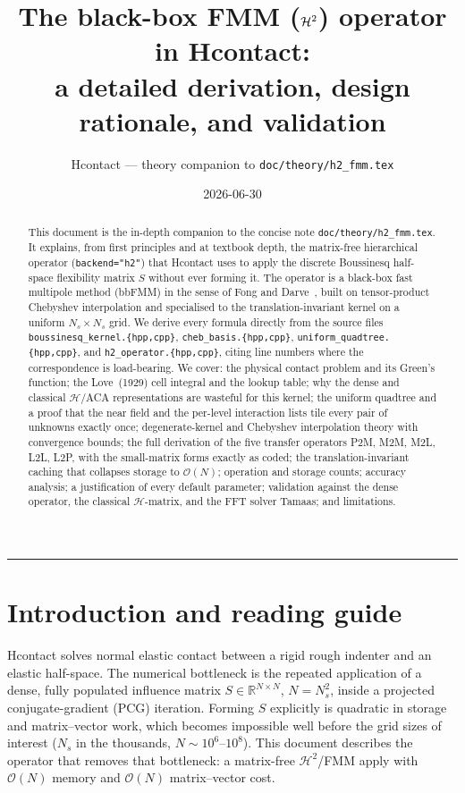 \documentclass[11pt,a4paper]{article}
\title{The black-box FMM ($\Htwo$) operator in Hcontact:\\[4pt]
a detailed derivation, design rationale, and validation}
\author{Hcontact --- theory companion to \texttt{doc/theory/h2\_fmm.tex}}
\date{2026-06-30}
\newcommand{\Order}{\mathcal{O}}
\newcommand{\R}{\mathbb{R}}
\newcommand{\Htwo}{\mathcal{H}^2}
\newcommand{\Hmat}{\mathcal{H}}
\newcommand{\code}[1]{\texttt{#1}}
\theoremstyle{definition}
\theoremstyle{remark}
\begin{document}
\maketitle

\begin{abstract}
This document is the in-depth companion to the concise note
\texttt{doc/theory/h2\_fmm.tex}. It explains, from first principles and at
textbook depth, the matrix-free hierarchical operator (\code{backend="h2"})
that Hcontact uses to apply the discrete Boussinesq half-space flexibility
matrix $S$ without ever forming it. The operator is a black-box fast multipole
method (bbFMM) in the sense of Fong and Darve~\cite{FongDarve2009}, built on
tensor-product Chebyshev interpolation and specialised to the
translation-invariant kernel on a uniform $N_s\times N_s$ grid. We derive every
formula directly from the source files \code{boussinesq\_kernel.\{hpp,cpp\}},
\code{cheb\_basis.\{hpp,cpp\}}, \code{uniform\_quadtree.\{hpp,cpp\}}, and
\code{h2\_operator.\{hpp,cpp\}}, citing line numbers where the correspondence is
load-bearing. We cover: the physical contact problem and its Green's function;
the Love~(1929) cell integral and the lookup table; why the dense and classical
$\Hmat$/ACA representations are wasteful for this kernel; the uniform quadtree
and a proof that the near field and the per-level interaction lists tile every
pair of unknowns exactly once; degenerate-kernel and Chebyshev interpolation
theory with convergence bounds; the full derivation of the five transfer
operators P2M, M2M, M2L, L2L, L2P, with the small-matrix forms exactly as
coded; the translation-invariant caching that collapses storage to $\Order(N)$;
operation and storage counts; accuracy analysis; a justification of every
default parameter; validation against the dense operator, the classical
$\Hmat$-matrix, and the FFT solver Tamaas; and limitations.
\end{abstract}

\tableofcontents
\bigskip
\hrule

\section{Introduction and reading guide}
\label{sec:intro}

Hcontact solves normal elastic contact between a rigid rough indenter and an
elastic half-space. The numerical bottleneck is the repeated application of a
dense, fully populated influence matrix $S\in\R^{N\times N}$, $N=N_s^2$, inside
a projected conjugate-gradient (PCG) iteration. Forming $S$ explicitly is
quadratic in storage and matrix--vector work, which becomes impossible well
before the grid sizes of interest ($N_s$ in the thousands, $N\sim10^{6}$--$10^{8}$).
This document describes the operator that removes that bottleneck: a
matrix-free $\Htwo$/FMM apply with $\Order(N)$ memory and $\Order(N)$
matrix--vector cost.
\end{document}
